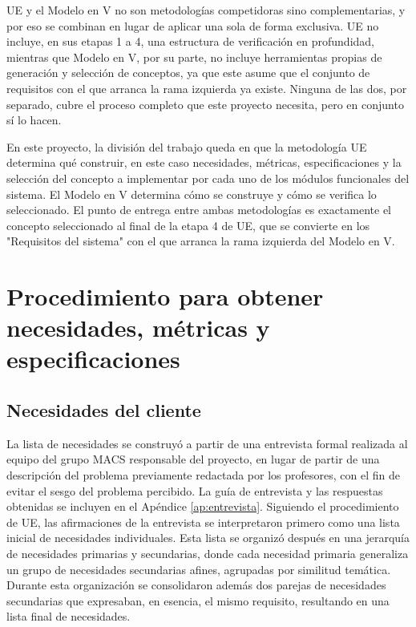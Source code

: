 UE y el Modelo en V no son metodologías competidoras sino complementarias, y por eso se combinan 
en lugar de aplicar una sola de forma exclusiva. UE no incluye, en sus etapas 1 a 4, una estructura 
de verificación en profundidad, mientras que Modelo en V, por su parte, no incluye 
herramientas propias de generación y selección de conceptos, ya que este asume que el conjunto de 
requisitos con el que arranca la rama izquierda ya existe. Ninguna de las dos, por separado, 
cubre el proceso completo que este proyecto necesita, pero en conjunto sí lo hacen. 

En este proyecto, la división del trabajo queda en que la metodología UE determina qué construir, en este caso 
necesidades, métricas, especificaciones y la selección del concepto a implementar por cada uno 
de los módulos funcionales del sistema. El  Modelo en V determina cómo se construye y cómo se 
verifica lo seleccionado. El punto de entrega entre ambas metodologías es exactamente el concepto 
seleccionado al final de la etapa 4 de UE, que se convierte en los "Requisitos del sistema" con el 
que arranca la rama izquierda del Modelo en V.

\newpage

\section{Procedimiento para obtener necesidades, métricas y especificaciones}

\subsection{Necesidades del cliente}

La lista de necesidades se construyó a partir de una entrevista formal realizada al equipo
del grupo MACS responsable del proyecto, en lugar de partir de una descripción del problema
previamente redactada por los profesores, con el fin de evitar el sesgo del problema percibido.
La guía de entrevista y las respuestas obtenidas se incluyen en el Apéndice \ref{ap:entrevista}. Siguiendo el
procedimiento de UE, las afirmaciones de la entrevista se interpretaron primero como una
lista inicial de necesidades individuales. Esta lista se organizó después en una jerarquía
de necesidades primarias y secundarias, donde cada necesidad primaria generaliza un grupo de
necesidades secundarias afines, agrupadas por similitud temática. Durante esta organización
se consolidaron además dos parejas de necesidades secundarias que expresaban, en esencia,
el mismo requisito, resultando en una lista final de necesidades. 

